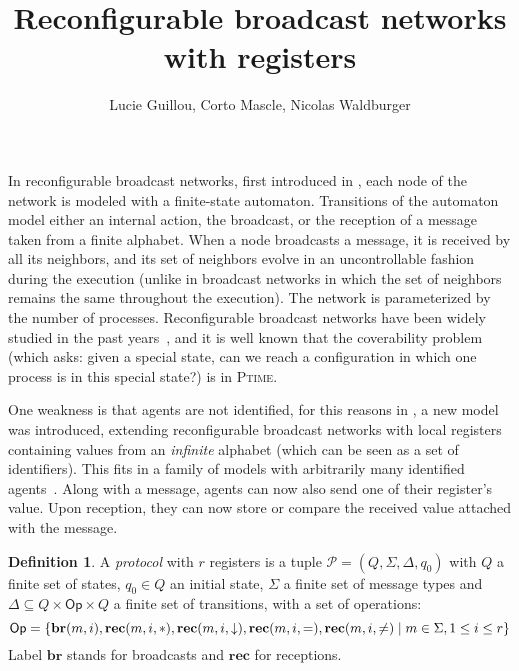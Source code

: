\documentclass{article}
\title{Reconfigurable broadcast networks with registers}
\author{Lucie Guillou, Corto Mascle, Nicolas Waldburger}
\date{}
\newcommand{\set}[1]{\{#1\}}
\theoremstyle{definition}
\newtheorem{definition}[theorem]{Definition}
\begin{document}
	
	\maketitle
	
	
	In reconfigurable broadcast networks, first introduced in \cite{DelzannoSZ2010Adhoc}, each node of the network is modeled with a finite-state automaton. Transitions of the automaton model either an internal action, the broadcast, or the reception of a message taken from a finite alphabet. When a node broadcasts a message, it is received by all its neighbors, and its set of neighbors evolve in an uncontrollable fashion during the execution (unlike in broadcast networks \cite{BZ83} in which the set of neighbors remains the same throughout the execution). The network is parameterized by the number of processes. Reconfigurable broadcast networks have been widely studied in the past years~\cite{Balasubramanian18, BalasubramanianGW22}, and it is well known that the coverability problem (which asks: given a special state, can we reach a configuration in which one process is in this special state?) is in \textsc{Ptime}.
	
	One weakness is that agents are not identified, for this reasons in \cite{DelzannoST13}, a new model was introduced, extending reconfigurable broadcast networks with local registers containing values from an \emph{infinite} alphabet (which can be seen as a set of identifiers). This fits in a family of models with arbitrarily many identified agents~\cite{AbdullaAKR14}. Along with a message, agents can now also send one of their register's value. Upon reception, they can now store or compare the received value attached with the message.
	
	
	\begin{definition}
		A \emph{protocol} with $r$ registers is a tuple $\mathcal{P} = (Q, \Sigma, \Delta, q_0)$  with $Q$ a finite set of states, $q_0 \in Q$ an initial state, $\Sigma$ a finite set of message types  and $\Delta \subseteq Q \times \mathsf{Op} \times Q$ a finite set of transitions, with a set of operations:\vspace{-0.3cm} \[\mathsf{Op} = \set{\mathbf{br}(m,i), \mathbf{rec}(m,i, \ast), \mathbf{rec}(m,i, \downarrow), \mathbf{rec}(m,i, =),\mathbf{rec}(m,i, \neq) \mid m \in \Sigma, 1 \leq i \leq r}\vspace{-0.3cm}\]
		Label $\mathbf{br}$ stands for broadcasts and $\mathbf{rec}$ for receptions.
		
	\end{definition}
	
\end{document}
